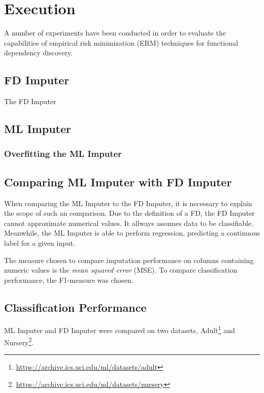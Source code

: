 \newpage
\section{Execution}
A number of experiments have been conducted in order to evaluate the capabilities of empirical risk minimization (ERM) techniques for functional dependency discovery.

\subsection{FD Imputer}
The FD Imputer

\subsection{ML Imputer}

\subsubsection{Overfitting the ML Imputer}

\subsection{Comparing ML Imputer with FD Imputer}
When comparing the ML Imputer to the FD Imputer, it is necessary to explain the scope of such an comparison.
Due to the definition of a FD, the FD Imputer cannot approximate numerical values.
It allways assumes data to be classifiable.
Meanwhile, the ML Imputer is able to perform regression, predicting a continuous label for a given input.

The measure chosen to compare imputation performance on columns containing numeric values is the \emph{mean squared error} (MSE).
To compare classification performance, the F1-measure was chosen.


\subsection{Classification Performance}
ML Imputer and FD Imputer were compared on two datasets, Adult\footnote{\url{https://archive.ics.uci.edu/ml/datasets/adult}} and Nursery\footnote{\url{https://archive.ics.uci.edu/ml/datasets/nursery}}.

